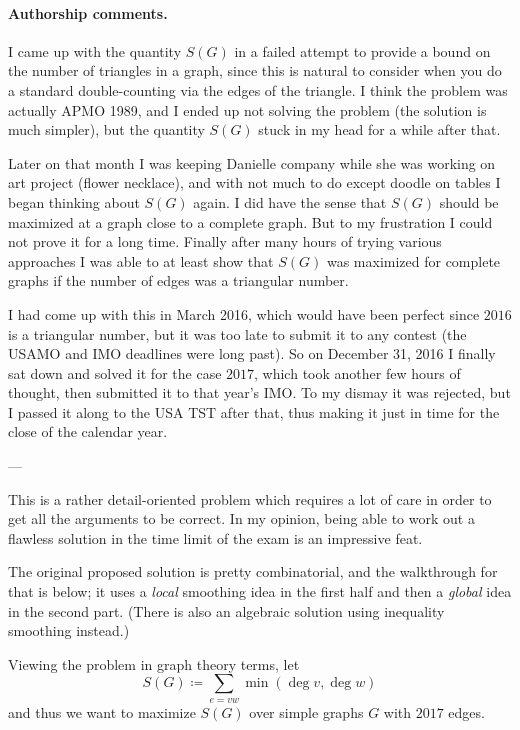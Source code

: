 \paragraph{Authorship comments.}
I came up with the quantity $S(G)$
in a failed attempt to provide a bound on the number of triangles in a graph,
since this is natural to consider when you do a standard
double-counting via the edges of the triangle.
I think the problem was actually APMO 1989,
and I ended up not solving the problem (the solution is much simpler),
but the quantity $S(G)$ stuck in my head for a while after that.

Later on that month I was keeping Danielle company while
she was working on art project (flower necklace),
and with not much to do except doodle on tables
I began thinking about $S(G)$ again.
I did have the sense that $S(G)$ should be maximized
at a graph close to a complete graph.
But to my frustration I could not prove it for a long time.
Finally after many hours of trying various approaches
I was able to at least show that $S(G)$ was maximized
for complete graphs if the number of edges was a triangular number.

I had come up with this in March 2016,
which would have been perfect since $2016$ is a triangular number,
but it was too late to submit it to any contest
(the USAMO and IMO deadlines were long past).
So on December 31, 2016 I finally sat down and solved it for the case $2017$,
which took another few hours of thought, then submitted it to that year's IMO.
To my dismay it was rejected, but I passed it along to the USA TST after that,
thus making it just in time for the close of the calendar year.

---

This is a rather detail-oriented problem which requires a lot of care
in order to get all the arguments to be correct.
In my opinion, being able to work out a flawless solution
in the time limit of the exam is an impressive feat.

The original proposed solution is pretty combinatorial,
and the walkthrough for that is below;
it uses a \emph{local} smoothing idea in the first half
and then a \emph{global} idea in the second part.
(There is also an algebraic solution using
inequality smoothing instead.)

Viewing the problem in graph theory terms,
let \[ S(G) \coloneqq \sum_{e = vw} \min \left( \deg v, \deg w \right) \]
and thus we want to maximize $S(G)$ over simple graphs $G$ with $2017$ edges.

